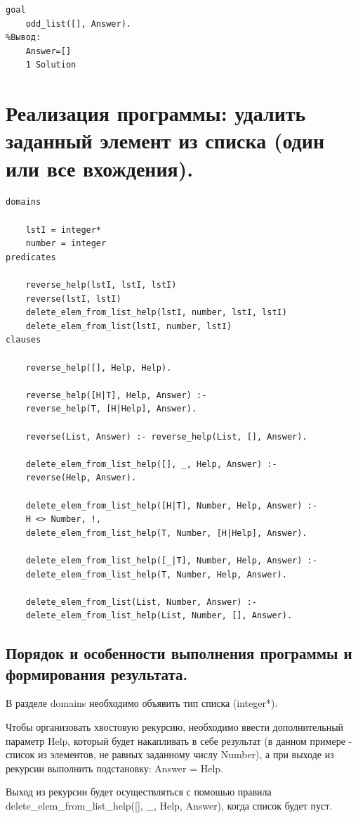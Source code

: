 \documentclass[a4paper,12pt]{article}
\begin{document}
\begin{verbatim}
goal
	odd_list([], Answer).
%Вывод:
	Answer=[]
	1 Solution
\end{verbatim}

\section*{Реализация программы: удалить заданный элемент из списка (один или все вхождения).}

\begin{verbatim}
domains

	lstI = integer*
	number = integer
predicates

	reverse_help(lstI, lstI, lstI)
	reverse(lstI, lstI)
	delete_elem_from_list_help(lstI, number, lstI, lstI)
	delete_elem_from_list(lstI, number, lstI)
clauses

	reverse_help([], Help, Help).
	
	reverse_help([H|T], Help, Answer) :-
	reverse_help(T, [H|Help], Answer).
	
	reverse(List, Answer) :- reverse_help(List, [], Answer).
	
	delete_elem_from_list_help([], _, Help, Answer) :- 
	reverse(Help, Answer).
	
	delete_elem_from_list_help([H|T], Number, Help, Answer) :-
	H <> Number, !, 
	delete_elem_from_list_help(T, Number, [H|Help], Answer).
	
	delete_elem_from_list_help([_|T], Number, Help, Answer) :-
	delete_elem_from_list_help(T, Number, Help, Answer).
	
	delete_elem_from_list(List, Number, Answer) :- 
	delete_elem_from_list_help(List, Number, [], Answer).
\end{verbatim}

\subsection*{Порядок и особенности выполнения программы и формирования результата.}

В разделе domains необходимо объявить тип списка (integer*).

Чтобы организовать хвостовую рекурсию, необходимо ввести дополнительный параметр Help, который будет накапливать в себе результат (в данном примере - список из элементов, не равных заданному числу Number), а при выходе из рекурсии выполнить подстановку: Answer = Help.

Выход из рекурсии будет осуществляться с помошью правила delete\_elem\_from\_list\_help([], \_, Help, Answer), когда список будет пуст.
\end{document}
